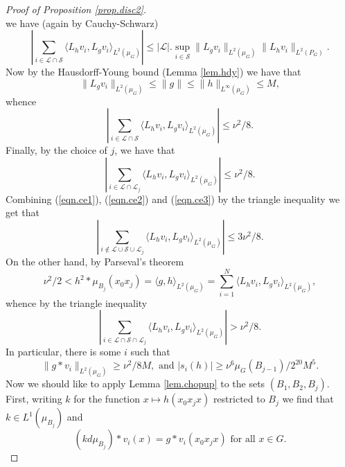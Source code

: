 \documentclass[12pt]{amsart}
\numberwithin{equation}{section}
\theoremstyle{plain}
\theoremstyle{definition}
\renewcommand{\leq}{\leqslant}
\renewcommand{\geq}{\geqslant}
\begin{document}
\begin{proof}[Proof of Proposition \ref{prop.disc2}]
\begin{equation*}
\end{equation*}
we have (again by Cauchy-Schwarz)
\begin{equation*}
 |\sum_{i \in \mathcal{L}\cap \mathcal{S}}{\langle L_hv_i,L_gv_i\rangle_{L^2(\mu_G)}}| \leq  |\mathcal{L}|.\sup_{i \in \mathcal{S}}{\|L_gv_i\|_{L^2(\mu_G)}\|L_hv_i\|_{L^2(P_G)}}.
\end{equation*}
Now by the Hausdorff-Young bound (Lemma \ref{lem.hdy}) we have that
\begin{equation*}
\|L_gv_i\|_{L^2(\mu_G)} \leq \|g\| \leq \|h\|_{L^\infty(\mu_G)} \leq M,
\end{equation*}
whence
\begin{equation}\label{eqn.ce2}
|\sum_{i \in \mathcal{L}\cap \mathcal{S}}{\langle L_hv_i,L_gv_i\rangle_{L^2(\mu_G)}}| \leq  \nu^2/8.
\end{equation}
Finally, by the choice of $j$, we have that
\begin{equation}\label{eqn.ce3}
 |\sum_{i \in \mathcal{L}\cap \mathcal{L}_j}{\langle L_hv_i,L_gv_i\rangle_{L^2(\mu_G)}}|\leq \nu^2/8.
\end{equation}
Combining (\ref{eqn.ce1}), (\ref{eqn.ce2}) and (\ref{eqn.ce3}) by the triangle inequality we get that
\begin{equation*}
|\sum_{i \not \in \mathcal{L}\cup \mathcal{S} \cup \mathcal{L}_j}{\langle L_hv_i,L_gv_i\rangle_{L^2(\mu_G)}}| \leq 3\nu^2/8.
\end{equation*}
On the other hand, by Parseval's theorem
\begin{equation*}
\nu^2/2 < h^2 \ast \mu_{B_j}(x_0x_j) = \langle g,h \rangle_{L^2(\mu_G)} = \sum_{i=1}^N{ \langle L_hv_i,L_gv_i\rangle_{L^2(\mu_G)}},
\end{equation*}
whence by the triangle inequality
\begin{equation*}
|\sum_{i \in \mathcal{L}\cap \mathcal{S} \cap \mathcal{L}_j}{\langle L_hv_i,L_gv_i\rangle_{L^2(\mu_G)}}| > \nu^2/8.
\end{equation*}
In particular, there is some $i$ such that
\begin{equation*}
\|g \ast v_i\|_{L^2(\mu_G)} \geq \nu^2/8M, \textrm{ and } |s_i(h)| \geq \nu^6\mu_G(B_{j-1})/2^{20}M^5.
\end{equation*}
Now we should like to apply Lemma \ref{lem.chopup} to the sets $(B_1,B_2,B_{j})$.  First, writing $k$ for the function $x \mapsto h(x_0x_jx)$ restricted to $B_j$ we find that $k \in L^1(\mu_{B_j})$ and
\begin{equation*}
(kd\mu_{B_j}) \ast v_i(x) = g \ast v_i(x_0x_jx) \textrm{ for all }x \in G.

\end{equation*}
\end{proof}
\end{document}
